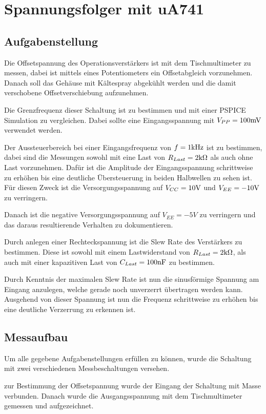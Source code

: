 \section{Spannungsfolger mit uA741}
\subsection{Aufgabenstellung}
Die Offsetspannung des Operationsverstärkers ist mit dem Tischmultimeter zu messen, dabei ist mittels eines Potentiometers ein Offsetabgleich vorzunehmen. Danach soll das Gehäuse mit Kältespray abgekühlt werden und die damit verschobene Offsetverschiebung aufzunehmen. 

Die Grenzfrequenz dieser Schaltung ist zu bestimmen und mit einer PSPICE Simulation zu vergleichen. Dabei sollte eine Eingangsspannung mit $V_{PP} = 100 \rm mV$ verwendet werden. 

Der Aussteuerbereich bei einer Eingangsfrequenz von $f=1 \rm kHz$ ist zu bestimmen, dabei sind die Messungen sowohl mit eine Last von $R_{Last} = 2 \rm k\Omega$ als auch ohne Last vorzunehmen. Dafür ist die Amplitude der Eingangsspannung schrittweise zu erhöhen bis eine deutliche Übersteuerung in beiden Halbwellen zu sehen ist. Für diesen Zweck ist die Versorgungsspannung auf $V_{CC} = 10\rm V$ und $V_{EE} = -10 \rm V$ zu verringern. 

Danach ist die negative Versorgungsspannung auf $V_{EE} = -5V$ zu verringern und das daraus resultierende Verhalten zu dokumentieren.

Durch anlegen einer Rechteckspannung ist die Slew Rate des Verstärkers zu bestimmen. Diese ist sowohl mit einem Lastwiderstand von $R_{Last} = 2\rm k\Omega$, als auch mit einer kapazitiven Last von $C_{Last} = 100 \rm nF$ zu bestimmen. 

Durch Kenntnis der maximalen Slew Rate ist nun die sinusförmige Spannung am Eingang anzulegen, welche gerade noch unverzerrt übertragen werden kann. Ausgehend von dieser Spannung ist nun die Frequenz schrittweise zu erhöhen bis eine deutliche Verzerrung zu erkennen ist. 


\subsection{Messaufbau}
Um alle gegebene Aufgabenstellungen erfüllen zu können, wurde die Schaltung mit zwei verschiedenen Messbeschaltungen versehen. 

zur Bestimmung der Offsetspannung wurde der Eingang der Schaltung mit Masse verbunden. Danach wurde die Ausgangsspannung mit dem Tischmultimeter gemessen und aufgezeichnet.

